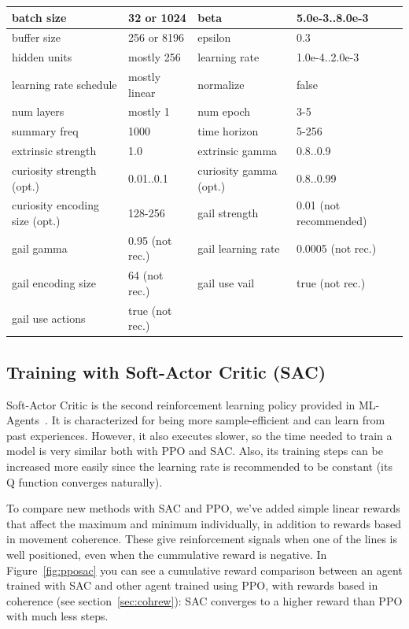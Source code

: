 \begin{center}
	\begin{tabular}{ | m{4cm} | m{2.5cm}||m{4cm} | m{2.5cm} | } 
		\hline
			batch size & 32 or 1024 & beta & 5.0e-3..8.0e-3\\ 
		\hline
			buffer size & 256 or 8196 & epsilon & 0.3\\
		\hline
			hidden units & mostly 256 & learning rate & 1.0e-4..2.0e-3\\
		\hline
			learning rate schedule & mostly linear & normalize & false\\
		\hline
			num layers & mostly 1 & num epoch & 3-5\\
		\hline
			summary freq & 1000 & time horizon & 5-256\\
		\hline
			extrinsic strength & 1.0 & extrinsic gamma & 0.8..0.9\\
		\hline
			curiosity strength (opt.) & 0.01..0.1 & curiosity gamma (opt.) & 0.8..0.99\\
		\hline
			curiosity encoding size (opt.) & 128-256 & gail strength & 0.01 (not recommended)\\
		\hline
			gail gamma & 0.95 (not rec.) & gail learning rate & 0.0005 (not rec.)\\
		\hline
			gail encoding size & 64 (not rec.) & gail use vail & true (not rec.)\\
		\hline
			gail use actions & true (not rec.) & & \\
		\hline
	\end{tabular}
\end{center}

\subsection{Training with Soft-Actor Critic (SAC)}

Soft-Actor Critic is the second reinforcement learning policy provided in ML-Agents~\cite{mlagents}. It is characterized for being more sample-efficient and can learn from past experiences. However, it also executes slower, so the time needed to train a model is very similar both with PPO and SAC. Also, its training steps can be increased more easily since the learning rate is recommended to be constant (its Q function converges naturally).

To compare new methods with SAC and PPO, we've added simple linear rewards that affect the maximum and minimum individually, in addition to rewards based in movement coherence. These give reinforcement signals when one of the lines is well positioned, even when the cummulative reward is negative. In Figure~\ref{fig:pposac} you can see a cumulative reward comparison between an agent trained with SAC and other agent trained using PPO, with rewards based in coherence (see section~\ref{sec:cohrew}): SAC converges to a higher reward than PPO with much less steps.

